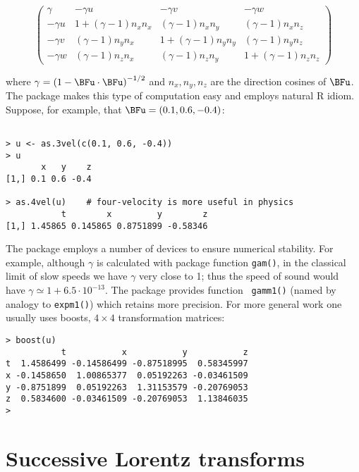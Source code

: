 \documentclass[ijoc,nonblindrev]{informs3} %
\begin{document}
\begin{equation}
  \begin{pmatrix}
\gamma &-\gamma u&-\gamma v&-\gamma w\\
    -\gamma u&1+(\gamma-1)n_xn_x&(\gamma-1)n_xn_y&(\gamma-1)n_xn_z\\
    -\gamma v&(\gamma-1)n_yn_x&1+(\gamma-1)n_yn_y&(\gamma-1)n_yn_z\\
    -\gamma w&(\gamma-1)n_zn_x&(\gamma-1)n_zn_y&1+(\gamma-1)n_zn_z
  \end{pmatrix}
\end{equation}

where $\gamma=\left(1-\BFu\cdot\BFu\right)^{-1/2}$ and $n_x,n_y,n_z$
are the direction cosines of $\BFu$.  The package makes this type of
computation easy and employs natural R idiom.  Suppose, for example,
that $\BFu=\left(0.1,0.6,-0.4\right)$:

\begin{verbatim}

> u <- as.3vel(c(0.1, 0.6, -0.4))
> u
       x   y    z
[1,] 0.1 0.6 -0.4

> as.4vel(u)    # four-velocity is more useful in physics
           t        x         y        z
[1,] 1.45865 0.145865 0.8751899 -0.58346

\end{verbatim}

The package employs a number of devices to ensure numerical stability.
For example, although $\gamma$ is calculated with package function
{\tt gam()}, in the classical limit of slow speeds we have $\gamma$
very close to 1; thus the speed of sound would have
$\gamma\simeq1+6.5\cdot 10^{-13}$.  The package provides function {\tt
  gamm1()} (named by analogy to {\tt expm1()}) which retains more
precision.  For more general work one usually uses boosts, $4\times 4$
transformation matrices:

\begin{verbatim}
> boost(u) 
           t           x           y           z
t  1.4586499 -0.14586499 -0.87518995  0.58345997
x -0.1458650  1.00865377  0.05192263 -0.03461509
y -0.8751899  0.05192263  1.31153579 -0.20769053
z  0.5834600 -0.03461509 -0.20769053  1.13846035
> 

\end{verbatim}

\section{Successive Lorentz transforms}
\end{document}
